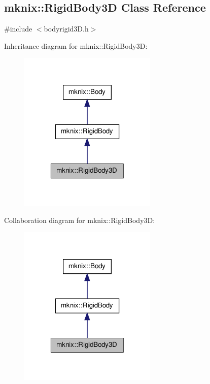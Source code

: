 \hypertarget{classmknix_1_1_rigid_body3_d}{\subsection{mknix\-:\-:Rigid\-Body3\-D Class Reference}
\label{classmknix_1_1_rigid_body3_d}
}


{\ttfamily \#include $<$bodyrigid3\-D.\-h$>$}



Inheritance diagram for mknix\-:\-:Rigid\-Body3\-D\-:\nopagebreak
\begin{figure}[H]
\begin{center}
\leavevmode
\includegraphics[width=186pt]{d5/de1/classmknix_1_1_rigid_body3_d__inherit__graph}
\end{center}
\end{figure}


Collaboration diagram for mknix\-:\-:Rigid\-Body3\-D\-:\nopagebreak
\begin{figure}[H]
\begin{center}
\leavevmode
\includegraphics[width=186pt]{d0/ddd/classmknix_1_1_rigid_body3_d__coll__graph}
\end{center}
\end{figure}
